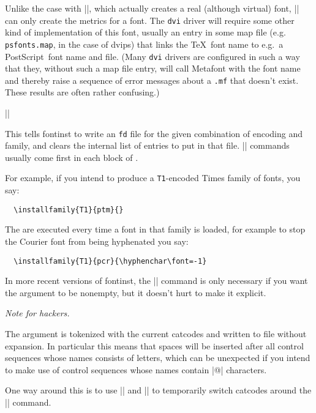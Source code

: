 \documentclass[a4paper]{ltxguide}
\newenvironment{hackernote}{%
   \list{}{
     \setlength{\leftmargin}{0pt}%
     \setlength\labelwidth{0pt}%
     \setlength{\listparindent}{1.4em}%
     \setlength{\parsep}{0pt plus 1pt}%
     \setlength{\itemsep}{\medskipamount}%
   }\item[]%
   \small
   \textit{Note for hackers.}\hspace{0.5em}%
}{\endlist}
\newcommand*{\meta}{\m}
\newcommand{\PS}{Post\-Script\xspace}
\newcommand*{\setfilename}[1]{\texttt{#1}}
\newcommand*{\setdotfilename}[1]{\setfilename{.#1}}
\newcommand*{\setpackagename}[1]{\textsf{#1}}
\newcommand{\dvips}   {\setpackagename{dvips}\xspace}
\newcommand{\fontinst}{\setpackagename{font\-inst}\xspace}
\newcommand{\fd} {\setfilename{fd}\xspace}
\newcommand{\dvi}{\setfilename{dvi}\xspace}
\begin{document}
Unlike the case with |\installfont|, which actually creates a real 
(although virtual) font, |\installrawfont| can only create the 
metrics for a font. The \dvi driver will require some other kind of 
implementation of this font, usually an entry in some map file (e.g. 
\texttt{psfonts.map}, in the case of \dvips) that links the \TeX\ font 
name to e.g.\ a \PS\ font name and file. (Many \dvi drivers are 
configured in such a way that they, without such a map file entry, 
will call Metafont with the font name and thereby raise a sequence of 
error messages about a \setdotfilename{mf} that doesn't exist. These 
results are often rather confusing.)



\begin{decl}
  |\installfamily|
\end{decl}
This tells \fontinst to write an \fd file for the given combination 
of encoding and family, and clears the internal list of entries to 
put in that file. |\installfamily| commands usually come first in each 
block of \meta{install commands}.

For example, if you intend to produce a \texttt{T1}-encoded Times 
family of fonts, you say:
\begin{verbatim}
  \installfamily{T1}{ptm}{}
\end{verbatim}
The  are executed every time a font in that family is
loaded, for example to stop the Courier font from being hyphenated you
say:
\begin{verbatim}
  \installfamily{T1}{pcr}{\hyphenchar\font=-1}
\end{verbatim}
In more recent versions of \fontinst, the |\installfamily| command is 
only necessary if you want the  argument to be 
nonempty, but it doesn't hurt to make it explicit.

\begin{hackernote}
  The  argument is tokenized with the current catcodes 
  and written to file without expansion. In particular this means 
  that spaces will be inserted after all control sequences whose 
  names consists of letters, which can be unexpected if you intend to 
  make use of control sequences whose names contain |@| characters.
  
  One way around this is to use |\fontinstcc| and |\normalcc| to 
  temporarily switch catcodes around the |\installfamily| command.
\end{hackernote}
\end{document}
